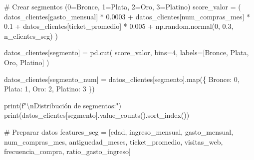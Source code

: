 \documentclass[
  doc,
  floatsintext,
  longtable,
  a4paper,
  nolmodern,
  notxfonts,
  notimes,
  12pt,
  colorlinks=true,linkcolor=blue,citecolor=blue,urlcolor=blue]{apa7}
\newenvironment{Shaded}{\begin{snugshade}}{\end{snugshade}}
\newcommand{\BuiltInTok}[1]{\textcolor[rgb]{0.00,0.23,0.31}{#1}}
\newcommand{\CharTok}[1]{\textcolor[rgb]{0.13,0.47,0.30}{#1}}
\newcommand{\CommentTok}[1]{\textcolor[rgb]{0.37,0.37,0.37}{#1}}
\newcommand{\DecValTok}[1]{\textcolor[rgb]{0.68,0.00,0.00}{#1}}
\newcommand{\FloatTok}[1]{\textcolor[rgb]{0.68,0.00,0.00}{#1}}
\newcommand{\NormalTok}[1]{\textcolor[rgb]{0.00,0.23,0.31}{#1}}
\newcommand{\OperatorTok}[1]{\textcolor[rgb]{0.37,0.37,0.37}{#1}}
\newcommand{\SpecialStringTok}[1]{\textcolor[rgb]{0.13,0.47,0.30}{#1}}
\newcommand{\StringTok}[1]{\textcolor[rgb]{0.13,0.47,0.30}{#1}}
\begin{document}
\begin{Shaded}
\begin{Highlighting}[]
\CommentTok{\# Crear segmentos (0=Bronce, 1=Plata, 2=Oro, 3=Platino)}
\NormalTok{score\_valor }\OperatorTok{=}\NormalTok{ (}
\NormalTok{    datos\_clientes[}\StringTok{\textquotesingle{}gasto\_mensual\textquotesingle{}}\NormalTok{] }\OperatorTok{*} \FloatTok{0.0003} \OperatorTok{+}
\NormalTok{    datos\_clientes[}\StringTok{\textquotesingle{}num\_compras\_mes\textquotesingle{}}\NormalTok{] }\OperatorTok{*} \FloatTok{0.1} \OperatorTok{+}
\NormalTok{    datos\_clientes[}\StringTok{\textquotesingle{}ticket\_promedio\textquotesingle{}}\NormalTok{] }\OperatorTok{*} \FloatTok{0.005} \OperatorTok{+}
\NormalTok{    np.random.normal(}\DecValTok{0}\NormalTok{, }\FloatTok{0.3}\NormalTok{, n\_clientes\_seg)}
\NormalTok{)}

\NormalTok{datos\_clientes[}\StringTok{\textquotesingle{}segmento\textquotesingle{}}\NormalTok{] }\OperatorTok{=}\NormalTok{ pd.cut(}
\NormalTok{    score\_valor,}
\NormalTok{    bins}\OperatorTok{=}\DecValTok{4}\NormalTok{,}
\NormalTok{    labels}\OperatorTok{=}\NormalTok{[}\StringTok{\textquotesingle{}Bronce\textquotesingle{}}\NormalTok{, }\StringTok{\textquotesingle{}Plata\textquotesingle{}}\NormalTok{, }\StringTok{\textquotesingle{}Oro\textquotesingle{}}\NormalTok{, }\StringTok{\textquotesingle{}Platino\textquotesingle{}}\NormalTok{]}
\NormalTok{)}

\NormalTok{datos\_clientes[}\StringTok{\textquotesingle{}segmento\_num\textquotesingle{}}\NormalTok{] }\OperatorTok{=}\NormalTok{ datos\_clientes[}\StringTok{\textquotesingle{}segmento\textquotesingle{}}\NormalTok{].}\BuiltInTok{map}\NormalTok{(\{}
    \StringTok{\textquotesingle{}Bronce\textquotesingle{}}\NormalTok{: }\DecValTok{0}\NormalTok{,}
    \StringTok{\textquotesingle{}Plata\textquotesingle{}}\NormalTok{: }\DecValTok{1}\NormalTok{,}
    \StringTok{\textquotesingle{}Oro\textquotesingle{}}\NormalTok{: }\DecValTok{2}\NormalTok{,}
    \StringTok{\textquotesingle{}Platino\textquotesingle{}}\NormalTok{: }\DecValTok{3}
\NormalTok{\})}

\BuiltInTok{print}\NormalTok{(}\SpecialStringTok{f"}\CharTok{\textbackslash{}n}\SpecialStringTok{Distribución de segmentos:"}\NormalTok{)}
\BuiltInTok{print}\NormalTok{(datos\_clientes[}\StringTok{\textquotesingle{}segmento\textquotesingle{}}\NormalTok{].value\_counts().sort\_index())}

\CommentTok{\# Preparar datos}
\NormalTok{features\_seg }\OperatorTok{=}\NormalTok{ [}\StringTok{\textquotesingle{}edad\textquotesingle{}}\NormalTok{, }\StringTok{\textquotesingle{}ingreso\_mensual\textquotesingle{}}\NormalTok{, }\StringTok{\textquotesingle{}gasto\_mensual\textquotesingle{}}\NormalTok{, }\StringTok{\textquotesingle{}num\_compras\_mes\textquotesingle{}}\NormalTok{,}
                \StringTok{\textquotesingle{}antiguedad\_meses\textquotesingle{}}\NormalTok{, }\StringTok{\textquotesingle{}ticket\_promedio\textquotesingle{}}\NormalTok{, }\StringTok{\textquotesingle{}visitas\_web\textquotesingle{}}\NormalTok{,}
                \StringTok{\textquotesingle{}frecuencia\_compra\textquotesingle{}}\NormalTok{, }\StringTok{\textquotesingle{}ratio\_gasto\_ingreso\textquotesingle{}}\NormalTok{]}


\end{Highlighting}
\end{Shaded}
\end{document}
